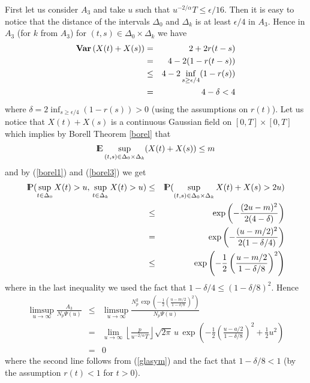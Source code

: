 First let us consider $A_3$ and take $u$ such that $u^{-2/\alpha}T\leq \epsilon/16$. Then it is easy to notice that the distance of the intervals $\Delta_0$ and $\Delta_k$ is at least $\epsilon/4$ in $A_3$. Hence in $A_3$ (for $k$ from $A_3$) for $(t,s)\in \Delta_0\times\Delta_k$ we have 
\begin{eqnarray}
{\bf Var\,}(X(t)+X(s))&=& 2+2r(t-s)\nonumber\\
&=& 4-2(1-r(t-s))\nonumber\\
&\leq & 4-2\inf_{s\geq \epsilon/4}(1-r(s))\nonumber\\
&=& 4-\delta<4\label{borel1}
\end{eqnarray}
where $\delta=2\inf_{s\geq \epsilon/4}(1-r(s))>0$ (using the assumptions on $r(t)$).
Let us notice that $X(t)+X(s)$ is a continuous Gaussian field on $[0,T]\times [0,T]$
which implies by Borell Theorem \ref{borel} that
\begin{equation}\label{borel3}
{\rm I\hspace{-0.8mm}E}\sup_{(t,s)\in \Delta_0\times\Delta_k}(X(t)+X(s))\leq m
\end{equation}
and by (\ref{borel1}) and (\ref{borel3}) we get
\begin{eqnarray*}
{\rm I\hspace{-0.8mm}P}(\sup_{t\in \Delta_0} X(t)>u,\,\sup_{t\in \Delta_k} X(t)>u)&\leq&
{\rm I\hspace{-0.8mm}P}(\sup_{(t,s)\in \Delta_0\times\Delta_k} X(t)+X(s)>2u)\\
&\leq &\exp\left(-\frac{(2u-m)^2}{2(4-\delta)}\right)\\
&=& \exp\left(-\frac{(u-m/2)^2}{2(1-\delta/4)}\right)\\
&\leq & \exp\left(-\frac{1}{2}\left(\frac{u-m/2}{1-\delta/8}\right)^2\right)
\end{eqnarray*}
where in the last inequality we used the fact that $1-\delta/4\leq (1-\delta/8)^2$.
Hence
\begin{eqnarray}
\limsup_{u\rightarrow\infty}\frac{A_3}{N_p \Psi(u)}
&\leq & \limsup_{u\rightarrow\infty}\frac{N_p^2\,\exp\left(-\frac{1}{2}\left(\frac{u-m/2}{1-\delta/8}\right)^2\right)}{N_p \Psi(u)}\nonumber\\
&=& \lim_{u\rightarrow\infty}\left\lfloor \frac{p}{u^{-2/\alpha}T}\right\rfloor
\sqrt{2\pi}\,u\,\exp(-\frac{1}{2}\left(\frac{u-a/2}{1-\delta/8}\right)^2
+\frac{1}{2}u^2)\nonumber\\
&=& 0 \label{lima3}
\end{eqnarray}
where the second line follows from (\ref{glasym}) and the fact that $1-\delta/8<1$ (by the assumption
$r(t)<1$ for $t>0$).

